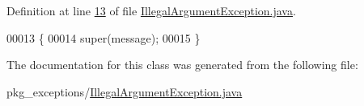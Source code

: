 Definition at line \hyperlink{IllegalArgumentException_8java_source_l00013}{13} of file \hyperlink{IllegalArgumentException_8java_source}{Illegal\-Argument\-Exception.\-java}.


\begin{DoxyCode}
00013                                                    \{
00014         super(message);
00015     \}
\end{DoxyCode}


The documentation for this class was generated from the following file\-:\begin{DoxyCompactItemize}
\item 
pkg\-\_\-exceptions/\hyperlink{IllegalArgumentException_8java}{Illegal\-Argument\-Exception.\-java}\end{DoxyCompactItemize}
